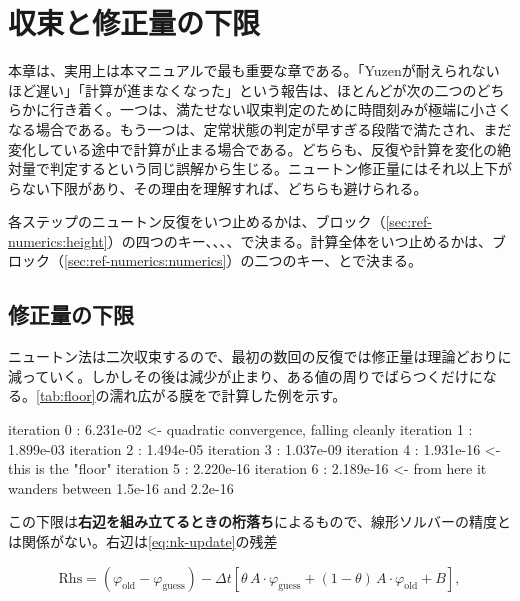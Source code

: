 \chapter{収束と修正量の下限}
\label{ch:convergence}

本章は、実用上は本マニュアルで最も重要な章である。「Yuzenが耐えられないほど遅い」「計算が進まなくなった」という報告は、ほとんどが次の二つのどちらかに行き着く。一つは、満たせない収束判定のために時間刻みが極端に小さくなる場合である。もう一つは、定常状態の判定が早すぎる段階で満たされ、まだ変化している途中で計算が止まる場合である。どちらも、反復や計算を変化の絶対量で判定するという同じ誤解から生じる。ニュートン修正量にはそれ以上下がらない下限があり、その理由を理解すれば、どちらも避けられる。

各ステップのニュートン反復をいつ止めるかは、ブロック（\cref{sec:ref-numerics:height}）の四つのキー、、、、で決まる。計算全体をいつ止めるかは、ブロック（\cref{sec:ref-numerics:numerics}）の二つのキー、とで決まる。

\section{修正量の下限}
\label{sec:convergence:floor}

ニュートン法は二次収束するので、最初の数回の反復では修正量は理論どおりに減っていく。しかしその後は減少が止まり、ある値の周りでばらつくだけになる。\cref{tab:floor}の濡れ広がる膜をで計算した例を示す。

\begin{plain}
iteration 0 : 6.231e-02      <- quadratic convergence, falling cleanly
iteration 1 : 1.899e-03
iteration 2 : 1.494e-05
iteration 3 : 1.037e-09
iteration 4 : 1.931e-16      <- this is the "floor"
iteration 5 : 2.220e-16
iteration 6 : 2.189e-16      <- from here it wanders between 1.5e-16 and 2.2e-16
\end{plain}

この下限は\textbf{右辺を組み立てるときの桁落ち}によるもので、線形ソルバーの精度とは関係がない。右辺は\cref{eq:nk-update}の残差

\begin{equation}\label{eq:residual}
  \mathrm{Rhs} = (\varphi_{\mathrm{old}} - \varphi_{\mathrm{guess}})
    - \Delta t\left[\theta\,A\cdot\varphi_{\mathrm{guess}}
      + (1-\theta)\,A\cdot\varphi_{\mathrm{old}} + B\right],
\end{equation}

